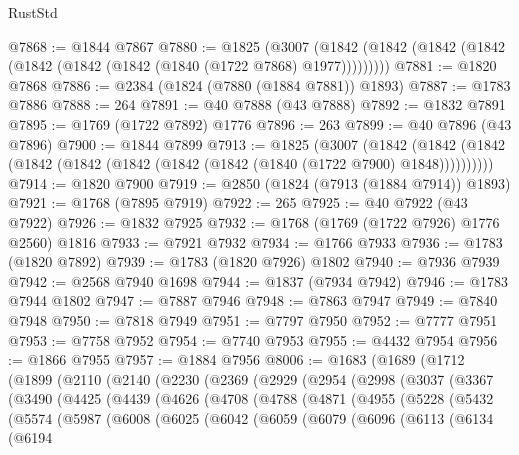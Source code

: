 \begin{lexlean}{RustStd}
\begin{coremodule}
{\begin{coremodule}
{{{{{{{{{{{{{{{{{{{{{{{{{{{{{{{{{{{{{{{{{{{{{{{@7868 := @1844 @7867
@7880 := @1825
    (@3007 (@1842 (@1842 (@1842 (@1842 (@1842 (@1842 (@1842 (@1840 (@1722 @7868) @1977)))))))))
@7881 := @1820 @7868
@7886 := @2384 (@1824 (@7880 (@1884 @7881)) @1893)
@7887 := @1783 @7886
@7888 := 264
@7891 := @40 @7888 (@43 @7888)
@7892 := @1832 @7891
@7895 := @1769 (@1722 @7892) @1776
@7896 := 263
@7899 := @40 @7896 (@43 @7896)
@7900 := @1844 @7899
@7913 := @1825
    (@3007
      (@1842 (@1842 (@1842 (@1842 (@1842 (@1842 (@1842 (@1842 (@1840 (@1722 @7900) @1848))))))))))
@7914 := @1820 @7900
@7919 := @2850 (@1824 (@7913 (@1884 @7914)) @1893)
@7921 := @1768 (@7895 @7919)
@7922 := 265
@7925 := @40 @7922 (@43 @7922)
@7926 := @1832 @7925
@7932 := @1768 (@1769 (@1722 @7926) @1776 @2560) @1816
@7933 := @7921 @7932
@7934 := @1766 @7933
@7936 := @1783 (@1820 @7892)
@7939 := @1783 (@1820 @7926) @1802
@7940 := @7936 @7939
@7942 := @2568 @7940 @1698
@7944 := @1837 (@7934 @7942)
@7946 := @1783 @7944 @1802
@7947 := @7887 @7946
@7948 := @7863 @7947
@7949 := @7840 @7948
@7950 := @7818 @7949
@7951 := @7797 @7950
@7952 := @7777 @7951
@7953 := @7758 @7952
@7954 := @7740 @7953
@7955 := @4432 @7954
@7956 := @1866 @7955
@7957 := @1884 @7956
@8006 := @1683
    (@1689
      (@1712
        (@1899
          (@2110
            (@2140
              (@2230
                (@2369
                  (@2929
                    (@2954
                      (@2998
                        (@3037
                          (@3367
                            (@3490
                              (@4425
                                (@4439
                                  (@4626
                                    (@4708
                                      (@4788
                                        (@4871
                                          (@4955
                                            (@5228
                                              (@5432
                                                (@5574
                                                  (@5987
                                                    (@6008
                                                      (@6025
                                                        (@6042
                                                          (@6059
                                                            (@6079
                                                              (@6096
                                                                (@6113
                                                                  (@6134
                                                                    (@6194
}}}}}}}}}}}}}}}}}}}}}}}}}}}}}}}}}}}}}}}}}}}}}}}
\end{coremodule}}
\end{coremodule}
\end{lexlean}
